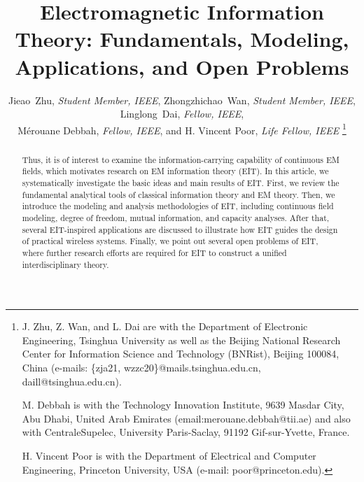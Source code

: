 \documentclass[journal,twocolumn]{IEEEtran}
\newcommand{\red}[1]{{\color{red}{#1}}}
\begin{document}
\title{Electromagnetic Information Theory: Fundamentals, Modeling, Applications, and Open Problems}

\author{{Jieao~Zhu, {\textit{Student Member, IEEE}}, Zhongzhichao~Wan, {\textit{Student Member, IEEE}}, Linglong~Dai, {\textit{Fellow, IEEE}},\\
M\'{e}rouane Debbah, {\textit{Fellow, IEEE}}, and H. Vincent Poor, {\textit{Life Fellow, IEEE}} }
\thanks{J. Zhu, Z. Wan, and L. Dai are with the Department of Electronic Engineering, Tsinghua University as well as the Beijing National Research Center for Information Science and Technology (BNRist), Beijing 100084, China (e-mails: \{zja21, wzzc20\}@mails.tsinghua.edu.cn, daill@tsinghua.edu.cn).

M. Debbah is with the Technology Innovation Institute, 9639 Masdar City, Abu Dhabi, United Arab Emirates (email:merouane.debbah@tii.ae) and also with CentraleSupelec, University Paris-Saclay, 91192 Gif-sur-Yvette, France. 

H. Vincent Poor is with the Department of Electrical and Computer Engineering, Princeton University, USA (e-mail: poor@princeton.edu).
}}

\maketitle

\begin{abstract}
	\red{Traditional massive multiple-input multiple-output (MIMO) information theory adopt non-physically consistent assumptions, including scalar-quantity, far-field, discretized, and monochromatic EM fields, which mismatch the nature of the underlying electromagnetic (EM) fields supporting the physical layer of wireless communication systems. }
 	Thus, it is of interest to examine the information-carrying capability of continuous EM fields, which motivates research on EM information theory (EIT). In this article, we systematically investigate the basic ideas and main results of EIT. First, we review the fundamental analytical tools of classical information theory and EM theory. Then, we introduce the modeling and analysis methodologies of EIT, including continuous field modeling, degree of freedom, mutual information, and capacity analyses. After that, several EIT-inspired applications are discussed to illustrate how EIT guides the design of practical wireless systems.  Finally, we point out several open problems of EIT, where further research efforts are required for EIT to construct a unified interdisciplinary theory.
\end{abstract}
\end{document}
